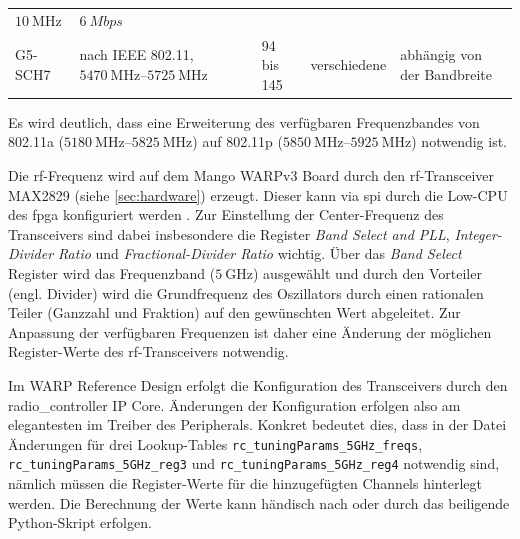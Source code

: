 \documentclass[letterpaper,11pt,ngerman]{article}
\begin{document}
\begin{onehalfspace}
\begin{longtable}[]{@{}lllll@{}}
\begin{minipage}[t]{0.14\columnwidth}
\(\SI{10}{\mega\hertz}\)\strut
\end{minipage} & \begin{minipage}[t]{0.18\columnwidth}\raggedright\strut
\(\SI{6}{Mbps}\)\strut
\end{minipage}\tabularnewline
\begin{minipage}[t]{0.08\columnwidth}\raggedright\strut
G5-SCH7\strut
\end{minipage} & \begin{minipage}[t]{0.30\columnwidth}\raggedright\strut
nach IEEE 802.11, \(\SIrange{5470}{5725}{\mega\hertz}\)\strut
\end{minipage} & \begin{minipage}[t]{0.16\columnwidth}\raggedright\strut
94 bis 145\strut
\end{minipage} & \begin{minipage}[t]{0.14\columnwidth}\raggedright\strut
verschiedene\strut
\end{minipage} & \begin{minipage}[t]{0.18\columnwidth}\raggedright\strut
abhängig von der Bandbreite\strut
\end{minipage}\tabularnewline
\bottomrule
\end{longtable}

Es wird deutlich, dass eine Erweiterung des verfügbaren Frequenzbandes
von 802.11a (\(\SIrange{5180}{5825}{\mega\hertz}\)) auf 802.11p
(\(\SIrange{5850}{5925}{\mega\hertz}\)) notwendig ist.

Die \ac{rf}-Frequenz wird auf dem Mango WARPv3 Board durch den
\ac{rf}-Transceiver MAX2829 (siehe \cref{sec:hardware})
erzeugt. Dieser kann via \ac{spi} durch die Low-CPU des \ac{fpga}
konfiguriert werden \autocite{max2829}. Zur Einstellung der
Center-Frequenz des Transceivers sind dabei insbesondere die Register
\emph{Band Select and PLL}, \emph{Integer-Divider Ratio} und
\emph{Fractional-Divider Ratio} wichtig. Über das \emph{Band Select}
Register wird das Frequenzband (\(\SI{5}{\giga\hertz}\)) ausgewählt und
durch den Vorteiler (engl. Divider) wird die Grundfrequenz des
Oszillators durch einen rationalen Teiler (Ganzzahl und Fraktion) auf
den gewünschten Wert abgeleitet. Zur Anpassung der verfügbaren
Frequenzen ist daher eine Änderung der möglichen Register-Werte des
\ac{rf}-Transceivers notwendig.

Im WARP Reference Design erfolgt die Konfiguration des Transceivers
durch den radio\_controller IP Core. Änderungen der Konfiguration
erfolgen also am elegantesten im Treiber des Peripherals. Konkret
bedeutet dies, dass in der Datei 
Änderungen für drei Lookup-Tables
\texttt{rc\_tuningParams\_5GHz\_freqs},
\texttt{rc\_tuningParams\_5GHz\_reg3} und
\texttt{rc\_tuningParams\_5GHz\_reg4} notwendig sind, nämlich müssen die
Register-Werte für die hinzugefügten Channels hinterlegt werden. Die
Berechnung der Werte kann händisch nach \autocite{max2829} oder durch
das beiligende Python-Skript erfolgen.


\end{onehalfspace}
\end{document}
